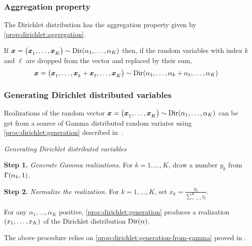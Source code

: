 \subsubsection{Aggregation property}


The Dirichlet distribution has the aggregation property given by \cref{prop:dirichlet:aggregation}.

\begin{prop}\label{prop:dirichlet:aggregation}
  If $\va x=\bracket{\va x_1,\ldots,\va x_K}\sim \Dir\bracket{\alpha_1,\ldots,\alpha_K}$ then, if the random variables with index $k$ and $\ell$ are dropped from the vector and replaced by their sum,
  $$\va x=\bracket{\va x_1,\ldots,\va x_k+\va x_{\ell},\ldots,\va x_K}\sim \Dir\bracket{\alpha_1,\ldots,\alpha_k+\alpha_{\ell},\ldots,\alpha_K}$$
\end{prop}



\subsubsection{Generating Dirichlet distributed variables}


Realizations of the random vector $\va x=\bracket{\va x_1,\ldots,\va x_K}\sim\Dir\bracket{\alpha_1,\ldots,\alpha_K}$ can be get from a source of Gamma distributed random variates using \cref{proc:dirichlet:generation} described in~\cite{Frigyik2010}.


\begin{proc}\label{proc:dirichlet:generation}
\emph{Generating Dirichlet distributed variables}

\textbf{Step 1.} \emph{Generate Gamma realizations.} For $k=1,\ldots,K$, draw a number $y_k$ from $\Gamma\bracket{\alpha_k,1}$.

\textbf{Step 2.} \emph{Normalize the realization.} For $k=1,\ldots,K$, set $x_k=\frac{y_k}{\sum_{\ell=1}^K y_{\ell}}$.
\end{proc}


\begin{prop}
For any $\alpha_1,\ldots,\alpha_K$ positive, \cref{proc:dirichlet:generation} produces a realization $\bracket{x_1,\ldots,x_K}$ of the Dirichlet distribution $\Dir\bracket{\alpha}$.
\end{prop}


The above procedure relies on \cref{prop:dirichlet:generation-from-gamma} proved in \cite{Devroye1986}.


